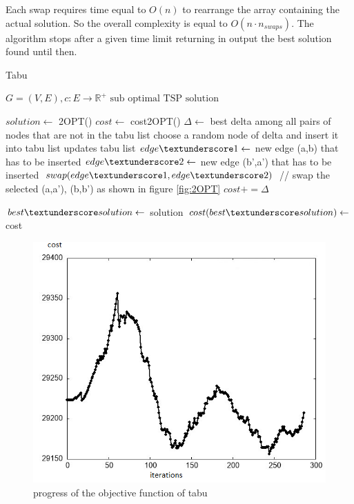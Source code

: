 Each swap requires time equal to $O(n)$ to rearrange the array containing the actual solution. So the overall complexity is equal to $O(n \cdot n_{swaps})$.
The algorithm stops after a given time limit returning in output the best solution found until then.

\begin{algorithm}[h!]
    \caption{Tabu}\label{algo:tabu}
    \begin{algorithmic}[1]
    \Require $G = (V,E), c:E \to \mathbb{R}^+$
    \Ensure $\text{sub optimal TSP solution}$


    \State $solution \gets$ 2OPT()
    \State $cost \gets$ cost\textunderscore 2OPT()
    \State $\Delta\gets$ best delta among all pairs of nodes that are not in the tabu list
    \State choose a random node of delta and insert it into tabu list
    \State updates tabu list
    \State $edge\textunderscore 1 \gets$ new edge (a,b) that has to be inserted
    \State $edge\textunderscore 2 \gets$ new edge (b',a') that has to be inserted
    \State $swap(edge\textunderscore 1,edge\textunderscore 2) $ // swap the selected (a,a'), (b,b') as shown in figure \ref{fig:2OPT}
    \State $cost += \Delta$

    \State $ best\textunderscore solution \gets$ solution
    \State $ cost(best\textunderscore solution) \gets$ cost
    \EndIf
    

    \EndWhile

    \end{algorithmic}
\end{algorithm}

\begin{figure}[!h]
    \centering
    \includegraphics[scale=0.8]{images/tabuperf.png}
    \caption{progress of the objective function of tabu}
    \label{fig:TABUPERF}
\end{figure}


